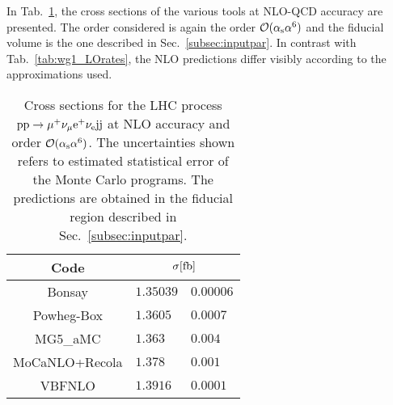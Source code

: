 In Tab.~\ref{tab:wg1_NLOrates}, the cross sections of the various tools at NLO-QCD accuracy are presented.
The order considered is again the order $\mathcal{O}(\alpha_{\rm s}\alpha^6)$ and the fiducial volume is the one described in Sec.~\ref{subsec:inputpar}.
In contrast with Tab.~\ref{tab:wg1_LOrates}, the NLO predictions differ visibly according to the approximations used.

\begin{table}[h!]
    \centering
    \begin{tabular}{c|r@{ $\pm$ }l}
      Code  &  \multicolumn{2}{c}{$\sigma[\rm{fb}]$}  \\
        \hline
        \hline
        {\sc Bonsay}  &  $1.35039$ & $0.00006$  \\
        {\sc Powheg-Box}  &  $1.3605\phantom{0}$  & $0.0007$   \\
        {\sc MG5\_aMC}&  $1.363\phantom{0}\phantom{0}$ & $0.004$  \\
        {\sc MoCaNLO+Recola}  &  $ 1.378\phantom{0}\phantom{0}$ & $0.001$ \\
        {\sc VBFNLO}  &  $1.3916\phantom{0}$ & $0.0001$  \\
    \end{tabular}
    \caption{\label{tab:wg1_NLOrates} Cross sections for the LHC process ${\rm p}{\rm p}\to\mu^+\nu_\mu{\rm e}^+\nu_{\rm e}{\rm j}{\rm j}$ at NLO accuracy and order $\mathcal{O}(\alpha_\text{s}\alpha^6)$.
    The uncertainties shown refers to estimated statistical error of the Monte Carlo programs.
    The predictions are obtained in the fiducial region described in Sec.~\ref{subsec:inputpar}.}
\end{table}

